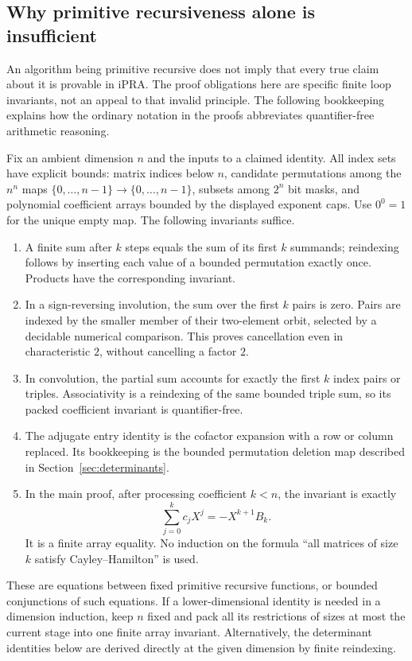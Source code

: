 \subsection{Why primitive recursiveness alone is insufficient}
\label{sec:induction}

An algorithm being primitive recursive does not imply that every true
claim about it is provable in iPRA. The proof obligations here are
specific finite loop invariants, not an appeal to that invalid principle.
The following bookkeeping explains how the ordinary notation in the
proofs abbreviates quantifier-free arithmetic reasoning.

Fix an ambient dimension $n$ and the inputs to a claimed identity. All
index sets have explicit bounds: matrix indices below $n$, candidate
permutations among the $n^n$ maps $\{0,\ldots,n-1\}\to\{0,\ldots,n-1\}$,
subsets among $2^n$ bit masks, and polynomial coefficient arrays bounded
by the displayed exponent caps. Use $0^0=1$ for the unique empty map.
The following invariants suffice.
\begin{enumerate}
\item A finite sum after $k$ steps equals the sum of its first $k$ summands;
reindexing follows by inserting each value of a bounded permutation
exactly once. Products have the corresponding invariant.
\item In a sign-reversing involution, the sum over the first $k$ pairs is
zero. Pairs are indexed by the smaller member of their two-element orbit,
selected by a decidable numerical comparison. This proves cancellation
even in characteristic $2$, without cancelling a factor $2$.
\item In convolution, the partial sum accounts for exactly the first $k$
index pairs or triples. Associativity is a reindexing of the same bounded
triple sum, so its packed coefficient invariant is quantifier-free.
\item The adjugate entry identity is the cofactor expansion with a row or
column replaced. Its bookkeeping is the bounded permutation deletion
map described in Section~\ref{sec:determinants}.
\item In the main proof, after processing coefficient $k<n$, the invariant
is exactly
\[
                \sum_{j=0}^{k} c_jX^j=-X^{k+1}B_k.
\]
It is a finite array equality. No induction on the formula ``all matrices
of size $k$ satisfy Cayley--Hamilton'' is used.
\end{enumerate}
These are equations between fixed primitive recursive functions, or
bounded conjunctions of such equations. If a lower-dimensional identity
is needed in a dimension induction, keep $n$ fixed and pack all its
restrictions of sizes at most the current stage into one finite array
invariant. Alternatively, the determinant identities below are derived
directly at the given dimension by finite reindexing.


